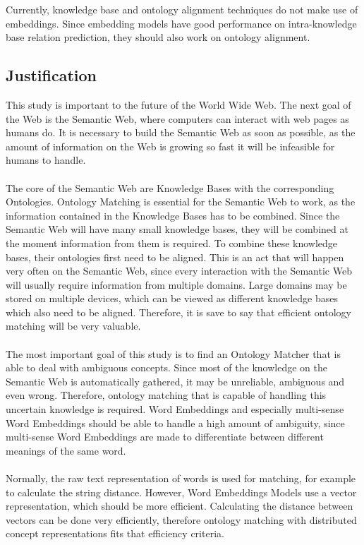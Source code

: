 \documentclass{article}
\begin{document}
 Currently, knowledge base and ontology alignment techniques do not make use of embeddings. Since embedding models have good performance on intra-knowledge base relation prediction, they should also work on ontology alignment.
 
 \subsection{Justification} 
 This study is important to the future of the World Wide Web. The next goal of the Web is the Semantic Web, where computers can interact with web pages as humans do. It is necessary to build the Semantic Web as soon as possible, as the amount of information on the Web is growing so fast it will be infeasible for humans to handle\cite{overload}.
 \paragraph{}
 The core of the Semantic Web are Knowledge Bases with the corresponding Ontologies. Ontology Matching is essential for the Semantic Web to work, as the information contained in the Knowledge Bases has to be combined. Since the Semantic Web will have many small knowledge bases, they will be combined at the moment information from them is required. To combine these knowledge bases, their ontologies first need to be aligned. This is an act that will happen very often on the Semantic Web, since every interaction with the Semantic Web will usually require information from multiple domains. Large domains may be stored on multiple devices, which can be viewed as different knowledge bases which also need to be aligned. Therefore, it is save to say that efficient ontology matching will be very valuable.
 \paragraph{}
 The most important goal of this study is to find an Ontology Matcher that is able to deal with ambiguous concepts. Since most of the knowledge on the Semantic Web is automatically gathered, it may be unreliable, ambiguous and even wrong. Therefore, ontology matching that is capable of handling this uncertain knowledge is required. Word Embeddings and especially multi-sense Word Embeddings should be able to handle a high amount of ambiguity, since multi-sense Word Embeddings are made to differentiate between different meanings of the same word.
 \paragraph{}
 Normally, the raw text representation of words is used for matching, for example to calculate the string distance. However, Word Embeddings Models use a vector representation, which should be more efficient.
 Calculating the distance between vectors can be done very efficiently, therefore ontology matching with distributed concept representations fits that efficiency criteria. 
\end{document}
